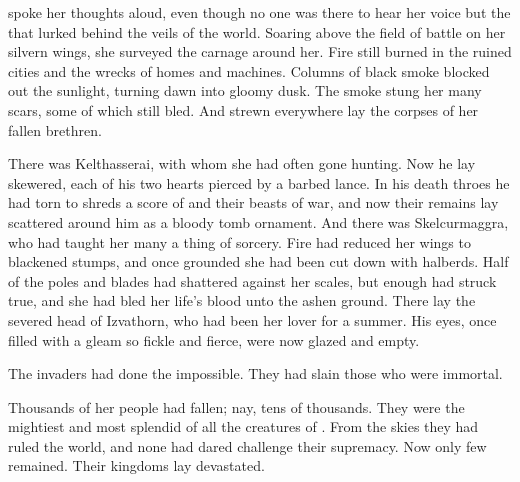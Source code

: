 
{\CryocasNzessuacrith} spoke her thoughts aloud, even though no one was there to hear her voice but the  that lurked behind the veils of the world. 
Soaring above the field of battle on her silvern wings, she surveyed the carnage around her. 
% 
Fire still burned in the ruined cities and the wrecks of homes and machines. 
Columns of black smoke blocked out the sunlight, turning dawn into gloomy dusk. 
The smoke stung her many scars, some of which still bled. 
And strewn everywhere lay the corpses of her fallen  brethren. 


There was Kelthasserai, with whom she had often gone hunting. 
Now he lay skewered, each of his two hearts pierced by a barbed  lance. 
In his death throes he had torn to shreds a score of \resphain{} and their beasts of war, and now their remains lay scattered around him as a bloody tomb ornament. 
And there was Skelcurmaggra, who had taught her many a thing of sorcery. 
Fire had reduced her wings to blackened stumps, and once grounded she had been cut down with halberds. 
Half of the poles and blades had shattered against her scales, but enough had struck true, and she had bled her life's blood unto the ashen ground. 
There lay the severed head of Izvathorn, who had been her lover for a summer. 
His eyes, once filled with a gleam so fickle and fierce, were now glazed and empty. 

The invaders had done the impossible. 
They had slain those who were immortal. 


Thousands of her people had fallen; nay, tens of thousands. 
They were the mightiest and most splendid of all the creatures of \Miith{}. From the skies they had ruled the world, and none had dared challenge their supremacy. 
Now only few remained. 
Their kingdoms lay devastated. 

